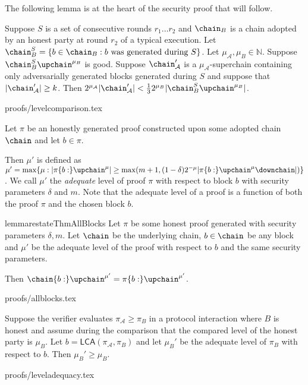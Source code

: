 The following lemma is at the heart of the security proof that will follow.

\begin{lemma}\label{lem.level-comparison}
    Suppose $S$ is a set of consecutive rounds $r_1 \ldots r_2$
    and $\chain_B$ is
    a chain adopted by an honest party at round $r_2$ of a typical execution.
    Let $\chain_B^S = \{b \in
    \chain_B: b \textnormal{ was generated during } S\}$. Let $\mu_\mathcal{A},
    \mu_B \in \mathbb{N}$. Suppose $\chain_B^S\upchain^{\mu_B}$ is good.
    Suppose $\chain'_\mathcal{A}$ is a $\mu_\mathcal{A}$-superchain containing
    only adversarially generated blocks generated during $S$ and suppose that
    $|\chain'_\mathcal{A}| \geq k$.
    Then
    $2^{\mu_\mathcal{A}}|\chain'_\mathcal{A}| < \frac{1}{3}2^{\mu_B}|\chain_B^S\upchain^{\mu_B}|$.
\end{lemma}
{proofs/levelcomparison.tex}

\begin{definition}
Let $\pi$ be an honestly generated proof constructed upon some adopted chain
$\chain$ and let $b \in \pi$.

Then $\mu'$ is defined as  $\mu' = \max\{\mu: |\pi\{b:\}\upchain^\mu| \geq
\max(m + 1, (1 - \delta)2^{-\mu}|\pi\{b:\}\upchain^\mu\downchain|)\}$.
We call $\mu'$ the \textit{adequate} level of proof $\pi$ with respect to
block $b$ with security parameters $\delta$ and $m$. Note that the adequate
level of a proof is a function of both the proof $\pi$ and the chosen block $b$.
\end{definition}

\begin{restatable}{lemma}{restateThmAllBlocks}\label{lem.allblocks}
Let $\pi$ be some honest proof generated with security parameters $\delta, m$.
Let $\chain$ be the underlying chain, $b \in \chain$ be any block and $\mu'$ be
the adequate level of the proof with respect to $b$ and the same security
parameters.

Then $\chain\{b:\}\upchain^{\mu'} = \pi\{b:\}\upchain^{\mu'}$.
\end{restatable}
{proofs/allblocks.tex}

\begin{lemma}
Suppose the verifier evaluates $\pi_\mathcal{A} \geq \pi_B$ in a protocol
interaction where $B$ is honest and assume during the comparison that the
compared level of the honest party is $\mu_B$. Let $b =
\textsf{LCA}(\pi_\mathcal{A}, \pi_B)$ and let $\mu_B'$ be the adequate
level of $\pi_B$ with respect to $b$. Then $\mu_B' \geq \mu_B$.
\end{lemma}
{proofs/leveladequacy.tex}

